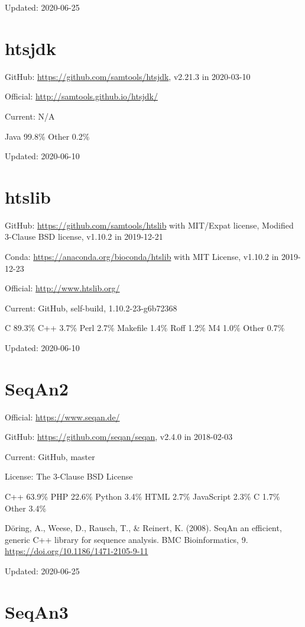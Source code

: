 \documentclass[]{article}
\begin{document}
Updated: 2020-06-25

\section{htsjdk}

GitHub: \url{https://github.com/samtools/htsjdk}, v2.21.3 in 2020-03-10

Official: \url{http://samtools.github.io/htsjdk/}

Current: N/A

Java 99.8\% Other 0.2\% 

Updated: 2020-06-10

\section{htslib}

GitHub: \url{https://github.com/samtools/htslib} with MIT/Expat license, Modified 3-Clause BSD license, v1.10.2 in 2019-12-21 

Conda: \url{https://anaconda.org/bioconda/htslib} with MIT License, v1.10.2 in 2019-12-23

Official: \url{http://www.htslib.org/}

Current: GitHub, self-build,  1.10.2-23-g6b72368

C 89.3\% C++ 3.7\% Perl 2.7\% Makefile 1.4\% Roff 1.2\% M4 1.0\% Other 0.7\%

Updated: 2020-06-10

\section{SeqAn2}

Official: \url{https://www.seqan.de/}

GitHub: \url{https://github.com/seqan/seqan}, v2.4.0 in 2018-02-03

Current: GitHub, master

License: The 3-Clause BSD License

C++ 63.9\% PHP 22.6\% Python 3.4\% HTML 2.7\% JavaScript 2.3\% C 1.7\% Other 3.4\%

Döring, A., Weese, D., Rausch, T., \& Reinert, K. (2008). SeqAn an efficient, generic C++ library for sequence analysis. BMC Bioinformatics, 9. \url{https://doi.org/10.1186/1471-2105-9-11}

Updated: 2020-06-25

\section{SeqAn3}
\end{document}
